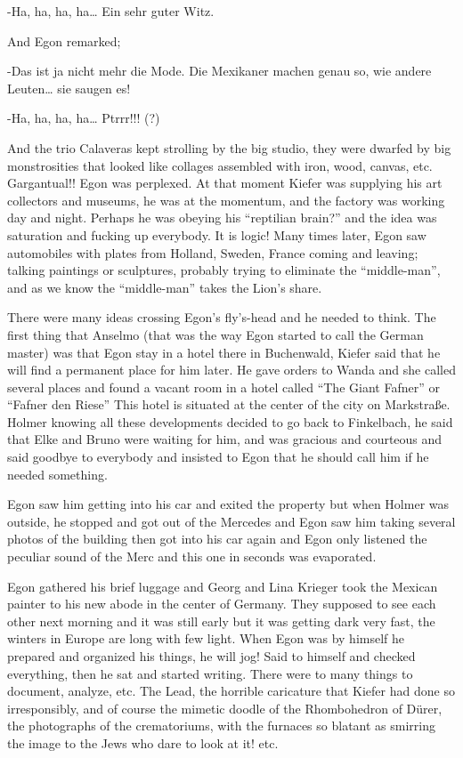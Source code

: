 \documentclass[smalldemyvopaper,11pt,twoside,onecolumn,openright,extrafontsizes]{memoir}
\begin{document}
-Ha, ha, ha, ha… Ein sehr guter Witz.

And Egon remarked;

-Das ist ja nicht mehr die Mode. Die Mexikaner machen genau so, wie andere Leuten… sie saugen es!

-Ha, ha, ha, ha… Ptrrr!!!  (?)

And the trio Calaveras kept strolling by the big studio, they were dwarfed by big monstrosities that looked like collages assembled with iron, wood, canvas, etc. Gargantual!! Egon was perplexed. At that moment Kiefer was supplying his art collectors and museums, he was at the momentum, and the factory was working day and night. Perhaps he was obeying his “reptilian brain?” and the idea was saturation and fucking up everybody. It is logic! Many times later, Egon saw automobiles with plates from Holland, Sweden, France coming and leaving; talking paintings or sculptures, probably trying to eliminate the “middle-man”, and as we know the “middle-man” takes the Lion’s share.

There were many ideas crossing Egon’s fly’s-head and he needed to think. The first thing that Anselmo (that was the way Egon started to call the German master) was that Egon stay in a hotel there in Buchenwald, Kiefer said that he will find a permanent place for him later. He gave orders to Wanda and she called several places and found a vacant room in a hotel called “The Giant Fafner” or “Fafner den Riese” This hotel is situated at the center of the city on Markstraße. Holmer knowing all these developments decided to go back to Finkelbach, he said that Elke and Bruno were waiting for him, and was gracious and courteous and said goodbye to everybody and insisted to Egon that he should call him if he needed something.

Egon saw him getting into his car and exited the property but when Holmer was outside, he stopped and got out of the Mercedes and Egon saw him taking several photos of the building then got into his car again and Egon only listened the peculiar sound of the Merc and this one in seconds was evaporated.

Egon gathered his brief luggage and Georg and Lina Krieger took the Mexican painter to his new abode in the center of Germany. They supposed to see each other next morning and it was still early but it was getting dark very fast, the winters in Europe are long with few light. When Egon was by himself he prepared and organized his things, he will jog! Said to himself and checked everything, then he sat and started writing. There were to many things to document, analyze, etc. The Lead, the horrible caricature that Kiefer had done so irresponsibly, and of course the mimetic doodle of the Rhombohedron of Dürer, the photographs of the crematoriums, with the furnaces so blatant as smirring the image to the Jews who dare to look at it!  etc.
\end{document}

